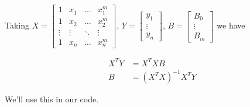 Taking
$X = \begin{bmatrix}
		1      & x_1    & \dots  & x_1^m  \\
		1      & x_2    & \dots  & x_2^m  \\
		\vdots & \vdots & \ddots & \vdots \\
		1      & x_n    & \dots  & x_n^m
	\end{bmatrix}$,
$Y = \begin{bmatrix}
		y_1 \\ \vdots \\ y_n
	\end{bmatrix}$,
$B = \begin{bmatrix}
		B_0 \\ \vdots \\ B_m
	\end{bmatrix}$
we have

\begin{align}
	X^TY & = X^TXB           \\
	B    & = (X^TX)^{-1}X^TY
\end{align}

We'll use this in our code.


